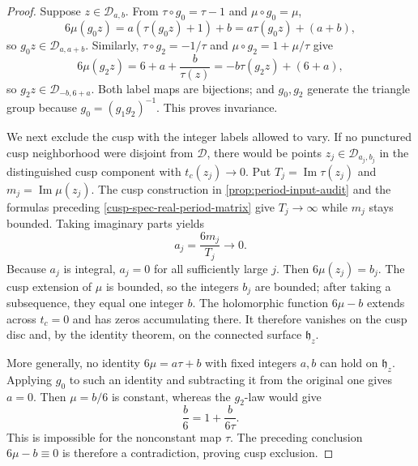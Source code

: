 \begin{proof}
Suppose \(z\in\mathcal D_{a,b}\).  From
\(\tau\circ g_0=\tau-1\) and \(\mu\circ g_0=\mu\),
\[
 6\mu(g_0z)=a(\tau(g_0z)+1)+b
 =a\tau(g_0z)+(a+b),
\]
so \(g_0z\in\mathcal D_{a,a+b}\).  Similarly,
\(\tau\circ g_2=-1/\tau\) and
\(\mu\circ g_2=1+\mu/\tau\) give
\[
 6\mu(g_2z)=6+a+\frac b{\tau(z)}
 =-b\tau(g_2z)+(6+a),
\]
so \(g_2z\in\mathcal D_{-b,6+a}\).  Both label maps are bijections; and
\(g_0,g_2\) generate the triangle group because
\(g_0=(g_1g_2)^{-1}\).  This proves invariance.

We next exclude the cusp with the integer labels allowed to vary.  If no
punctured cusp neighborhood were disjoint from \(\mathcal D\), there would be
points \(z_j\in\mathcal D_{a_j,b_j}\) in the distinguished cusp component
with \(t_c(z_j)\to0\).  Put
\(T_j=\operatorname{Im}\tau(z_j)\) and
\(m_j=\operatorname{Im}\mu(z_j)\).  The cusp construction in
\cref{prop:period-input-audit} and the formulas preceding
\cref{cusp-spec-real-period-matrix} give
\(T_j\to\infty\) while \(m_j\) stays bounded.  Taking imaginary parts yields
\begin{equation}
 a_j=\frac{6m_j}{T_j}\longrightarrow0.
 \label{cusp-spec-cusp-label-a-limit}
\end{equation}
Because \(a_j\) is integral, \(a_j=0\) for all sufficiently large \(j\).
Then \(6\mu(z_j)=b_j\).  The cusp extension of \(\mu\) is bounded, so the
integers \(b_j\) are bounded; after taking a subsequence, they equal one
integer \(b\).  The holomorphic function \(6\mu-b\) extends across
\(t_c=0\) and has zeros accumulating there.  It therefore vanishes on the
cusp disc and, by the identity theorem, on the connected surface
\(\mathfrak h_z\).

More generally, no identity
\(6\mu=a\tau+b\) with fixed integers \(a,b\) can hold on
\(\mathfrak h_z\).  Applying \(g_0\) to such an identity and subtracting it
from the original one gives \(a=0\).  Then \(\mu=b/6\) is constant, whereas
the \(g_2\)-law would give
\begin{equation}
 \frac b6=1+\frac{b}{6\tau}.
 \label{cusp-spec-constant-mu-contradiction}
\end{equation}
This is impossible for the nonconstant map \(\tau\).  The preceding
conclusion \(6\mu-b\equiv0\) is therefore a contradiction, proving cusp
exclusion.


\end{proof}
